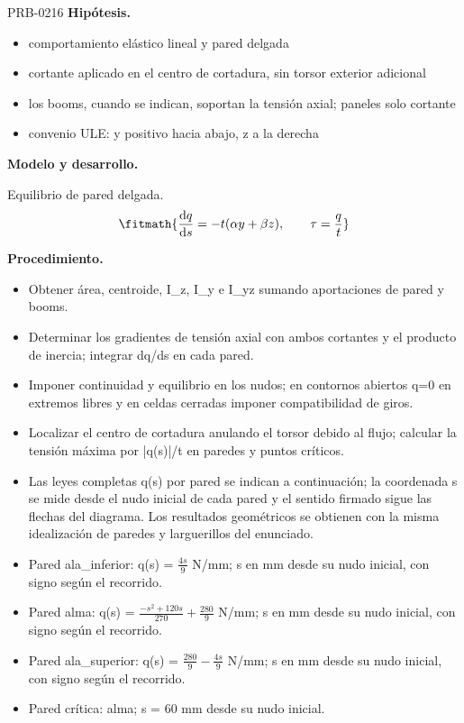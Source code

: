 \begin{studiumworked}{PRB-0216}
\textbf{Hipótesis.}\begin{itemize}\item comportamiento elástico lineal y pared delgada
\item cortante aplicado en el centro de cortadura, sin torsor exterior adicional
\item los booms, cuando se indican, soportan la tensión axial; paneles solo cortante
\item convenio ULE: y positivo hacia abajo, z a la derecha\end{itemize}

\textbf{Modelo y desarrollo.}

Equilibrio de pared delgada.\[\fitmath{\frac{\mathrm{d}q}{\mathrm{d}s}=-t(\alpha y+\beta z),\qquad \tau=\frac{q}{t}}\]

\textbf{Procedimiento.}\begin{itemize}\item Obtener área, centroide, I\_z, I\_y e I\_yz sumando aportaciones de pared y booms.
\item Determinar los gradientes de tensión axial con ambos cortantes y el producto de inercia; integrar dq/ds en cada pared.
\item Imponer continuidad y equilibrio en los nudos; en contornos abiertos q=0 en extremos libres y en celdas cerradas imponer compatibilidad de giros.
\item Localizar el centro de cortadura anulando el torsor debido al flujo; calcular la tensión máxima por |q(s)|/t en paredes y puntos críticos.
\item Las leyes completas q(s) por pared se indican a continuación; la coordenada s se mide desde el nudo inicial de cada pared y el sentido firmado sigue las flechas del diagrama. Los resultados geométricos se obtienen con la misma idealización de paredes y larguerillos del enunciado.
\item Pared ala\_inferior: q(s) = $\frac{4 s}{9}$ N/mm; s en mm desde su nudo inicial, con signo según el recorrido.
\item Pared alma: q(s) = $\frac{- s^{2} + 120 s}{270} + \frac{280}{9}$ N/mm; s en mm desde su nudo inicial, con signo según el recorrido.
\item Pared ala\_superior: q(s) = $\frac{280}{9} - \frac{4 s}{9}$ N/mm; s en mm desde su nudo inicial, con signo según el recorrido.
\item Pared crítica: alma; s = 60 mm desde su nudo inicial.\end{itemize}


\end{studiumworked}
